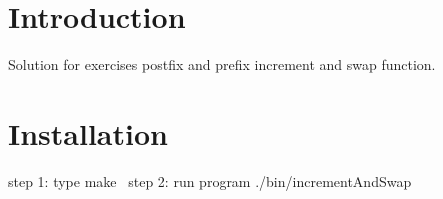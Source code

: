 \hypertarget{index_Introduction}{}\section{Introduction}\label{index_Introduction}
Solution for exercises postfix and prefix increment and swap function.\hypertarget{index_Installation}{}\section{Installation}\label{index_Installation}
step 1\+: type make~\newline
step 2\+: run program ./bin/increment\+And\+Swap 